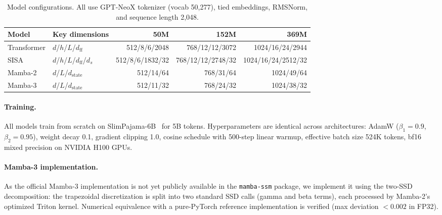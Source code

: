 \documentclass[11pt]{article}
\begin{document}
\begin{table}[h]
\centering
\small
\caption{Model configurations. All use GPT-NeoX tokenizer (vocab 50,277), tied embeddings, RMSNorm, and sequence length 2,048.}
\label{tab:configs}
\begin{tabular}{llrrr}
\toprule
\textbf{Model} & \textbf{Key dimensions} & \textbf{50M} & \textbf{152M} & \textbf{369M} \\
\midrule
Transformer & $d$/$h$/$L$/$d_{\text{ff}}$ & 512/8/6/2048 & 768/12/12/3072 & 1024/16/24/2944 \\
SISA & $d$/$h$/$L$/$d_{\text{ff}}$/$d_s$ & 512/8/6/1832/32 & 768/12/12/2748/32 & 1024/16/24/2512/32 \\
Mamba-2 & $d$/$L$/$d_{\text{state}}$ & 512/14/64 & 768/31/64 & 1024/49/64 \\
Mamba-3 & $d$/$L$/$d_{\text{state}}$ & 512/11/32 & 768/24/32 & 1024/38/32 \\
\bottomrule
\end{tabular}
\end{table}

\paragraph{Training.} All models train from scratch on SlimPajama-6B~\citep{slimpajama} for 5B tokens. Hyperparameters are identical across architectures: AdamW ($\beta_1 = 0.9$, $\beta_2 = 0.95$), weight decay 0.1, gradient clipping 1.0, cosine schedule with 500-step linear warmup, effective batch size 524K tokens, bf16 mixed precision on NVIDIA H100 GPUs.

\paragraph{Mamba-3 implementation.} As the official Mamba-3 implementation is not yet publicly available in the \texttt{mamba-ssm} package, we implement it using the two-SSD decomposition: the trapezoidal discretization is split into two standard SSD calls (gamma and beta terms), each processed by Mamba-2's optimized Triton kernel. Numerical equivalence with a pure-PyTorch reference implementation is verified (max deviation $< 0.002$ in FP32).
\end{document}
